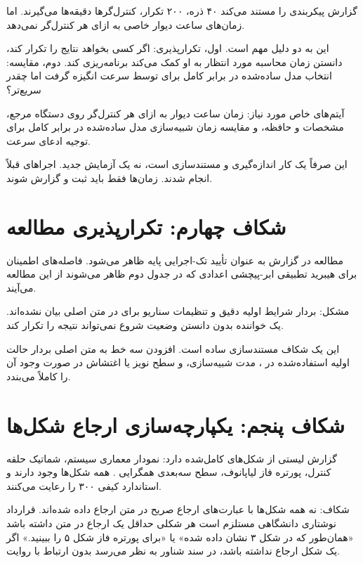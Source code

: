 \documentclass[12pt, a4paper]{article}
\newcommand{\dash}{\lr{---}}
\begin{document}
گزارش پيکربندی  را مستند می‌کند \dash{} ۴۰ ذره، ۲۰۰ تکرار، کنترل‌گرها دقيقه‌ها می‌گيرند. اما زمان‌های ساعت ديوار خاصی به ازای هر کنترل‌گر نمی‌دهد.

اين به دو دليل مهم است. اول، تکرارپذيری: اگر کسی بخواهد نتايج  را تکرار کند، دانستن زمان محاسبه مورد انتظار به او کمک می‌کند برنامه‌ريزی کند. دوم، مقايسه: انتخاب مدل ساده‌شده در برابر کامل برای  توسط سرعت انگيزه گرفت \dash{} اما چقدر سريع‌تر؟

آيتم‌های خاص مورد نياز: زمان ساعت ديوار  به ازای هر کنترل‌گر روی دستگاه مرجع، مشخصات  و حافظه، و مقايسه زمان شبيه‌سازی مدل ساده‌شده در برابر کامل برای توجيه ادعای سرعت.

اين صرفاً يک کار اندازه‌گيری و مستندسازی است، نه يک آزمايش جديد. اجراهای  قبلاً انجام شدند. زمان‌ها فقط بايد ثبت و گزارش شوند.

\section{شکاف چهارم: تکرارپذيری مطالعه }

مطالعه  در گزارش به عنوان تأييد تک-اجرايی پايه ظاهر می‌شود. فاصله‌های اطمينان برای هيبريد تطبيقی ابر-پيچشی \dash{} اعدادی که در جدول  دوم ظاهر می‌شوند \dash{} از اين مطالعه می‌آيند.

مشکل: بردار شرايط اوليه دقيق و تنظيمات سناريو برای  در متن اصلی بيان نشده‌اند. يک خواننده بدون دانستن وضعيت شروع نمی‌تواند نتيجه  را تکرار کند.

اين يک شکاف مستندسازی ساده است. افزودن سه خط به متن اصلی \dash{} بردار حالت اوليه استفاده‌شده در ، مدت شبيه‌سازی، و سطح نويز يا اغتشاش در صورت وجود \dash{} آن را کاملاً می‌بندد.

\section{شکاف پنجم: يکپارچه‌سازی ارجاع شکل‌ها}

گزارش ليستی از شکل‌های کامل‌شده دارد: نمودار معماری سيستم، شماتيک حلقه کنترل، پورتره فاز لياپانوف، سطح سه‌بعدی همگرايی . همه شکل‌ها وجود دارند و استاندارد کيفی ۳۰۰  را رعايت می‌کنند.

شکاف: نه همه شکل‌ها با عبارت‌های ارجاع صريح در متن ارجاع داده شده‌اند. قرارداد نوشتاری دانشگاهی مستلزم است هر شکلی حداقل يک ارجاع در متن داشته باشد \dash{} «همان‌طور که در شکل ۳ نشان داده شده» يا «برای پورتره فاز شکل ۵ را ببينيد.» اگر يک شکل ارجاع نداشته باشد، در سند شناور به نظر می‌رسد بدون ارتباط با روايت.
\end{document}
